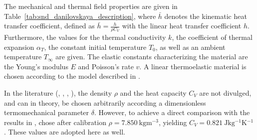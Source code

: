 The mechanical and thermal field properties are given in Table~\ref{tab:snd_danilovskaya_description}, where \(\bar{h}\) denotes the kinematic heat transfer coefficient, defined as \(\bar{h}=\frac{h}{\rho C_V}\) with the linear heat transfer coefficient \(h\).
Furthermore, the values for the thermal conductivity \(k\), the coefficient of thermal expansion \(\alpha_{T}\), the constant initial temperature \(T_{0}\), as well as an ambient temperature \(T_{\infty}\) are given.
The elastic constants characterizing the material are the Young's modulus \(E\) and Poisson's rate \(v\).
A linear thermoelastic material is chosen according to the model described in \cite{armero_new_1992}.

In the literature (\cite{farhat_unconditionally_1991}, \cite{tosaka_boundary_1991}, \cite{tamma_effective_1992}, \cite{tanaka_application_1995}), the density \(\rho\) and the heat capacity \(C_V\) are not divulged, and can in theory, be chosen arbitrarily according a dimensionless termomechanical parameter \(\delta\).
However, to achieve a direct comparison with the results in \cite{tanaka_application_1995}, \cite{danowski_computational_2014} chose after calibration \(\rho=\SI{7.850}{\kilo\gram\meter^{-3}}\), yielding \(C_V = \SI[exponent-mode=engineering]{0.821}{\joule\kg^{-1}\kelvin^{-1}}\).
These values are adopted here as well.

